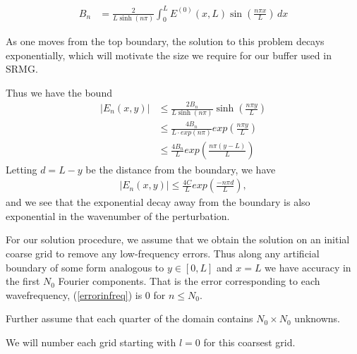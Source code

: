 \documentclass[final]{siamart1116}
\numberwithin{theorem}{section}
\begin{document}
\begin{align*}
  B_n &= \frac{2}{L \sinh(n\pi)} \int^L_0 E^{(0)}(x, L) \sin\left(\frac{n\pi x}{L}\right) \,dx
\end{align*}

As one moves from the top boundary, the solution to this problem decays exponentially, which will motivate the size we require for our buffer used in SRMG.



Thus we have the bound
\begin{align*}
\left|E_n(x, y)\right| &\leq \frac{2 B_n}{L \sinh(n\pi)} \sinh\left(\frac{n \pi y}{L}\right) \\
&\leq \frac{4 B_n}{L \cdot exp(n\pi)} exp({\frac{n \pi y}{L}}) \\
&\leq \frac{4 B_n}{L} exp({\frac{n \pi (y-L)}{L}}) 
\end{align*}
Letting $d = L-y$ be the distance from the boundary, we have
\begin{align}
  \left|E_n(x, y)\right| \leq \frac{4C}{L} exp({\frac{-n \pi d}{L}}), \label{errorbound}
\end{align}
and we see that the exponential decay away from the boundary is also exponential in the wavenumber of the perturbation.


For our solution procedure, we assume that we obtain the solution on an initial coarse grid to remove any low-frequency errors. Thus along any artificial boundary of some form analogous to $y \in [0, L]$ and $x = L$ we have accuracy in the first $N_0$ Fourier components. That is the error corresponding to each wavefrequency, (\ref{errorinfreq}) is 0 for $n \leq N_0$.

Further assume that each quarter of the domain contains $N_0 \times N_0$ unknowns. 

We will number each grid starting with $l = 0$ for this coarsest grid. 
\end{document}
